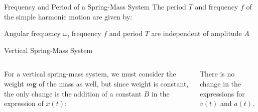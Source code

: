 \documentclass[12pt,compress,aspectratio=169]{beamer}
\begin{document}
\begin{frame}{Frequency and Period of a Spring-Mass System}
  The period $T$ and frequency $f$ of the simple harmonic motion are given by:

  
  Angular frequency $\omega$, frequency $f$ and period $T$ are independent
  of amplitude $A$
\end{frame}



\begin{frame}{Vertical Spring-Mass System}
  \vspace{.2in}
  \begin{columns}

    For a vertical spring-mass system, we must consider the weight $m\bm{g}$
    of the mass as well, but since weight is constant, the only change is the
    addition of a constant $B$ in the expression of $x(t)$:
    
    \vspace{-.4in}{\Large
      \begin{align*}
        x(t)&=A\cos(\omega t-\phi) +B\\
        v(t)&=-A\omega\sin(\omega t-\phi)\\
        a(t)&=-A\omega^2\cos(\omega t-\phi)
      \end{align*}
    }
    There is no change in the expressions for $v(t)$ and $a(t)$.
  \end{columns}
\end{frame}
\end{document}
